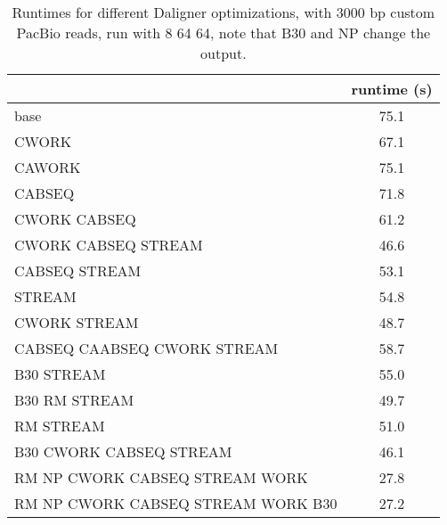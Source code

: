 \documentclass[../main/thesis.tex]{subfiles}
\begin{document}
\begin{table}
\centering
\caption{Runtimes for different Daligner optimizations, with 3000 bp custom PacBio reads, run with 8 64 64, note that B30 and NP change the output.}
\label{tbl:daligner1}
\begin{tabular}{l c}
& runtime (s) \\ \hline
base & 75.1 \\
CWORK & 67.1 \\
CAWORK & 75.1 \\
CABSEQ & 71.8 \\
CWORK CABSEQ & 61.2 \\
CWORK CABSEQ STREAM & 46.6 \\
CABSEQ STREAM & 53.1 \\
STREAM & 54.8 \\ 
CWORK STREAM & 48.7 \\
CABSEQ CAABSEQ CWORK STREAM & 58.7 \\ \hline
B30 STREAM & 55.0 \\
B30 RM STREAM & 49.7 \\
RM STREAM & 51.0 \\
B30 CWORK CABSEQ STREAM & 46.1 \\ \hline
RM NP CWORK CABSEQ STREAM WORK & 27.8 \\
RM NP CWORK CABSEQ STREAM WORK B30 & 27.2 \\

\end{tabular}
\end{table}
\end{document}
